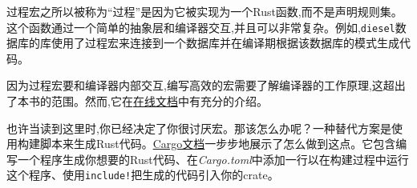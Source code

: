 过程宏之所以被称为“过程”是因为它被实现为一个Rust函数,而不是声明规则集。这个函数通过一个简单的抽象层和编译器交互,并且可以非常复杂。例如,\texttt{diesel}数据库的库使用了过程宏来连接到一个数据库并在编译期根据该数据库的模式生成代码。

因为过程宏要和编译器内部交互,编写高效的宏需要了解编译器的工作原理,这超出了本书的范围。然而,它在\href{https://doc.rust-lang.org/book/ch19-06-macros.html\#procedural-macros-for-generating-code-from-attributes}{在线文档}中有充分的介绍。

也许当读到这里时,你已经决定了你很讨厌宏。那该怎么办呢？一种替代方案是使用构建脚本来生成Rust代码。\href{https://doc.crates.io/build-script.html\#case-study-code-generation}{Cargo文档}一步步地展示了怎么做到这点。它包含编写一个程序生成你想要的Rust代码、在\emph{Cargo.toml}中添加一行以在构建过程中运行这个程序、使用\texttt{include!}把生成的代码引入你的crate。
